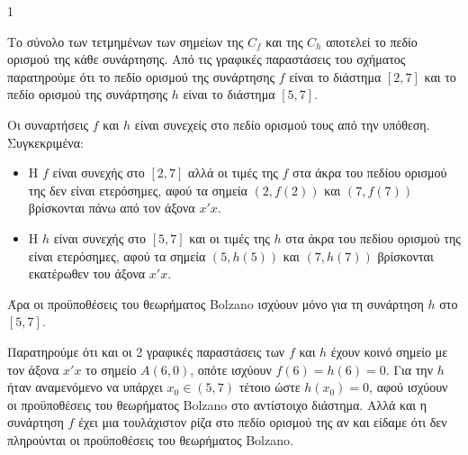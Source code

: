 \begin{ylh}{1}
    \item [Ύλη από εικόνα]
\end{ylh}
\begin{alist}
    \item Το σύνολο των τετμημένων των σημείων της $C_f$ και της $C_h$ αποτελεί το πεδίο ορισμού της κάθε συνάρτησης. Από τις γραφικές παραστάσεις του σχήματος παρατηρούμε ότι το πεδίο ορισμού της συνάρτησης $f$ είναι το διάστημα $[2,7]$ και το πεδίο ορισμού της συνάρτησης $h$ είναι το διάστημα $[5,7]$.
    \item
    \begin{rlist}
        \item Οι συναρτήσεις $f$ και $h$ είναι συνεχείς στο πεδίο ορισμού τους από την υπόθεση.
        Συγκεκριμένα:
        \begin{itemize}
            \item Η $f$ είναι συνεχής στο $[2,7]$ αλλά οι τιμές της $f$ στα άκρα του πεδίου ορισμού της δεν είναι ετερόσημες, αφού τα σημεία $(2,f(2))$ και $(7,f(7))$ βρίσκονται πάνω από τον άξονα $x'x$.
            \item Η $h$ είναι συνεχής στο $[5,7]$ και οι τιμές της $h$ στα άκρα του πεδίου ορισμού της είναι ετερόσημες, αφού τα σημεία $(5,h(5))$ και $(7,h(7))$ βρίσκονται εκατέρωθεν του άξονα $x'x$.
        \end{itemize}
        Άρα οι προϋποθέσεις του θεωρήματος Bolzano ισχύουν μόνο για τη συνάρτηση $h$ στο $[5,7]$.
        \item Παρατηρούμε ότι και οι 2 γραφικές παραστάσεις των $f$ και $h$ έχουν κοινό σημείο με τον άξονα $x'x$ το σημείο $A(6,0)$, οπότε ισχύουν $f(6) = h(6) = 0$.
        Για την $h$ ήταν αναμενόμενο να υπάρχει $x_0 \in (5,7)$ τέτοιο ώστε $h(x_0) = 0$, αφού ισχύουν οι προϋποθέσεις του θεωρήματος Bolzano στο αντίστοιχο διάστημα. Αλλά και η συνάρτηση $f$ έχει μια τουλάχιστον ρίζα στο πεδίο ορισμού της αν και είδαμε ότι δεν πληρούνται οι προϋποθέσεις του θεωρήματος Bolzano.
    \end{rlist}
\end{alist}